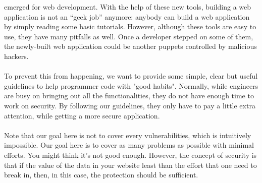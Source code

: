 \documentclass[12pt, a4paper]{article}
\begin{document}
emerged for web development. With the help of these new tools,
building a web application is not an ``geek job'' anymore:
anybody can build a web application by simply reading some basic tutorials.
However, although these tools are easy to use,
they have many pitfalls as well.
Once a developer stepped on some of them, the newly-built web application could
be another puppets controlled by malicious hackers.
\\\\
To prevent this from happening, we want to provide some simple, clear but
useful guidelines to help programmer code with "good habits".
Normally, while engineers are busy on bringing out all the functionalities,
they do not have enough time to work on security. By following our guidelines,
they only have to pay a little extra attention, while getting a more secure application.
\\\\
Note that our goal here is not to cover every vulnerabilities, which is intuitively impossible.
Our goal here is to cover as many problems as possible with minimal efforts.
You might think it's not good enough.
However, the concept of security is that if the value of the data in your website
least than the effort that one need to break in, then, in this case,
the protection should be sufficient.
%
%
%
\end{document}
